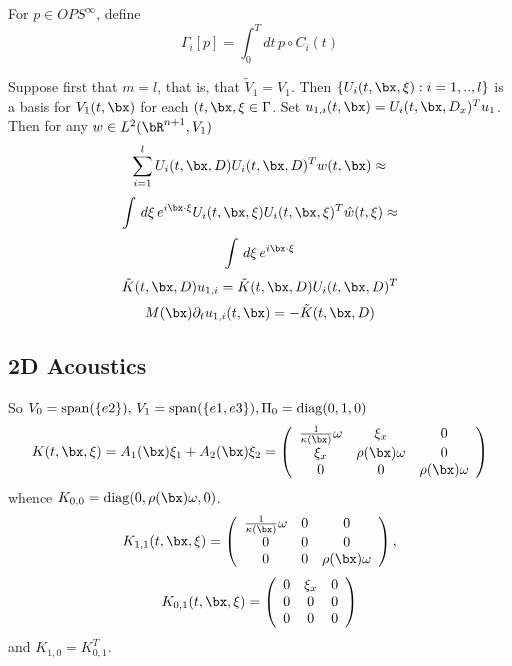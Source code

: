For $p \in OPS^{\infty}$, define
\[
  \Gamma_i[p] = \int_0^T dt \, p \circ C_i(t)
\]


Suppose first that $m=l$, that is, that $\tilde{V}_1=V_1$. Then $\{U_i(t,\bx,\xi):i=1,..,l\}$ is a basis for $V_1(t,\bx)$ for each $(t,\bx,\xi \in \Gamma$. Set $u_{1,i}(t,\bx) = U_i(t,\bx,D_x)^Tu_1$. Then for any $w \in L^2(\bR^{n+1},V_1)$
\[
  \sum_{i=1}^l U_i(t,\bx,D)U_i(t,\bx,D)^Tw(t,\bx) \approx
\]
\[
  \int \, d\xi \, e^{i \bx \cdot \xi} U_i(t,\bx,\xi)U_i(t,\bx,\xi)^T\hat{w}(t,\xi) \approx
\]
\[
  \int \, d\xi \, e^{i \bx \cdot \xi}
\]
\[
  \tilde{K}(t,\bx,D)u_{1,i} = \tilde{K}(t,\bx,D)U_i(t,\bx,D)^T
\]
\[
  M(\bx)\partial_t u_{1,i}(t,\bx) = -\tilde{K}(t,\bx,D)
\]

\subsection{2D Acoustics}
So $V_0={\rm span}(\{e2\}),\, V_1={\rm span}(\{e1,e3\}), \Pi_0 = {\rm diag}(0,1,0)$ 
\[
  K(t,\bx,\xi) =  A_1(\bx) \xi_1 + A_2(\bx) \xi_2 =
  \left(
    \begin{array}{ccc}
      \frac{1}{\kappa(\bx)}\omega & \xi_x & 0 \\
      \xi_x & \rho(\bx) \omega & 0 \\
      0 & 0 & \rho(\bx) \omega
    \end{array}
  \right)
\]
whence $K_{0,0} = {\rm diag}(0, \rho(\bx) \omega, 0)$.
\[
  K_{1,1}(t,\bx,\xi) =
  \left(
    \begin{array}{ccc}
      \frac{1}{\kappa(\bx)}\omega & 0 & 0 \\
      0 & 0 & 0 \\
      0 & 0 & \rho(\bx) \omega
    \end{array}
  \right),
\]
\[
  K_{0,1}(t,\bx,\xi) =
  \left(
    \begin{array}{ccc}
      0 & \xi_x & 0 \\
      0 & 0 & 0 \\
      0 & 0 & 0
    \end{array}
  \right)
\]
and $K_{1,0} = K_{0,1}^T$.
  
